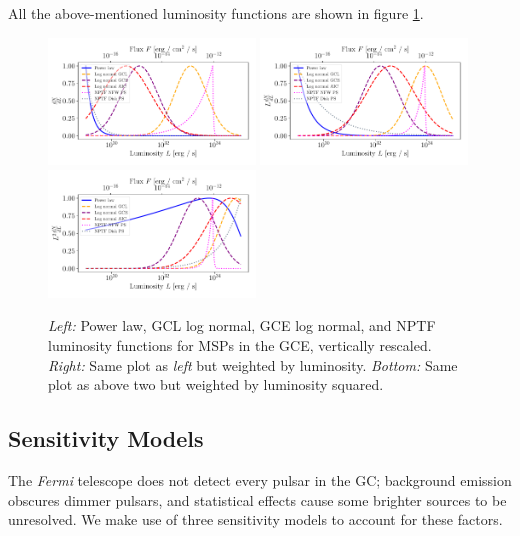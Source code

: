 \documentclass[a4paper,11pt]{article}
\newcommand{\comment}[1]{\emph{\color{red}{#1}}}
\begin{document}
All the above-mentioned luminosity functions are shown in figure \ref{fig:lum-funcs}.

\begin{figure}
    \centering
    \includegraphics[width=0.49\textwidth]{figs/lum-funcs.pdf}
    \includegraphics[width=0.49\textwidth]{figs/l-lum-funcs.pdf}
    \includegraphics[width=0.49\textwidth]{figs/l2-lum-funcs.pdf}
    \caption{\textit{Left:} Power law, GCL log normal, GCE log normal, and NPTF luminosity functions for MSPs in the GCE, vertically rescaled. \textit{Right:} Same plot as \textit{left} but weighted by luminosity. \textit{Bottom:} Same plot as above two but weighted by luminosity squared.}
    \label{fig:lum-funcs}
\end{figure}


\subsection{Sensitivity Models}
\label{sec:sensitivity}
\comment{Should I name these Model A, Model B, Model C, or keep the descriptive but vague names? Which is easier to follow?} The \textit{Fermi} telescope does not detect every pulsar in the GC; background emission obscures dimmer pulsars, and statistical effects cause some brighter sources to be unresolved. We make use of three sensitivity models to account for these factors.
\end{document}
